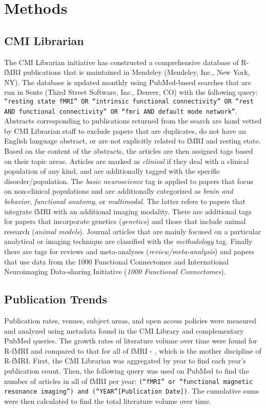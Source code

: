 \documentclass[12pt,3p]{elsarticle}
\begin{document}
\section{Methods}

\subsection{CMI Librarian}

The CMI Librarian initiative has constructed a comprehensive database of R-fMRI
publications that is maintained in Mendeley (Mendeley, Inc., New York, NY). The
database is updated monthly using PubMed-based searches that are run in Sente
(Third Street Software, Inc., Denver, CO) with the following query: \texttt{``resting
state fMRI'' OR ``intrinsic functional connectivity'' OR ``rest AND functional
connectivity'' OR ``fmri AND default mode network''}. Abstracts corresponding to
publications returned from the search are hand vetted by CMI Librarian staff to
exclude papers that are duplicates, do not have an English language abstract, or
are not explicitly related to fMRI and resting state. Based on the content of
the abstracts, the articles are then assigned tags based on their topic areas.
Articles are marked as \emph{clinical} if they deal with a clinical population of any
kind, and are additionally tagged with the specific disorder/population. The
\emph{basic neuroscience} tag is applied to papers that focus on non-clinical
populations and are additionally categorized as \emph{brain and behavior},
\emph{functional anatomy}, or \emph{multimodal}. The latter refers to papers that integrate fMRI with an
additional imaging modality. There are additional tags for papers that
incorporate genetics (\emph{genetics}) and those that include animal research
(\emph{animal models}). Journal articles that are mainly focused on a particular analytical or
imaging technique are classified with the \emph{methodology} tag. Finally there are
tags for reviews and meta-analyses (\emph{review/meta-analysis}) and papers that use
data from the 1000 Functional Connectomes and International Neuroimaging
Data-sharing Initiative (\emph{1000 Functional Connectomes}). 

\subsection{Publication Trends}
Publication rates, venues, subject areas, and open access policies were measured
and analyzed using metadata found in the CMI Library and complementary PubMed
queries. The growth rates of literature volume over time were found for
R-fMRI and compared to that for all of fMRI - , which is the mother
discipline of R-fMRI. First, the CMI Librarian was aggregated by year to
find each year’s publication count. Then, the following query was used on PubMed
to find the number of articles in all of fMRI per year: \texttt{(``fMRI'' or
``functional
magnetic resonance imaging'') and (``YEAR''[Publication Date])}.  The cumulative
sums were then calculated to find the total literature volume over time.
\end{document}
